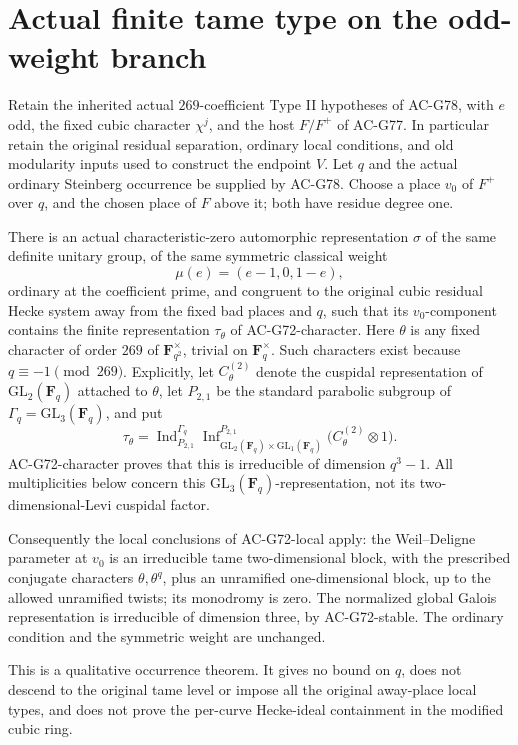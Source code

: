 \section{Actual finite tame type on the odd-weight branch}
\label{sec:cubic-actual-finite-type}

\begin{theorem}
\label{thm:G78-type}
Retain the inherited actual \(269\)-coefficient Type II hypotheses
of AC-G78, with \(e\) odd, the fixed cubic character \(\chi^j\),
and the host \(F/F^+\) of AC-G77.
In particular retain the original residual separation, ordinary
local conditions, and old modularity inputs used to construct
the endpoint \(V\).
Let \(q\) and the actual ordinary Steinberg occurrence be supplied
by AC-G78.  Choose a place \(v_0\) of \(F^+\) over \(q\), and the
chosen place of \(F\) above it; both have residue degree one.

There is an actual characteristic-zero automorphic representation
\(\sigma\) of the same definite unitary group, of the same symmetric
classical weight
\[
                         \mu(e)=(e-1,0,1-e),
\]
ordinary at the coefficient prime, and congruent to the original
cubic residual Hecke system away from the fixed bad places and \(q\),
such that its \(v_0\)-component contains the finite representation
\(\tau_\theta\) of AC-G72-character.
Here \(\theta\) is any fixed character of order \(269\) of
\(\mathbf F_{q^2}^{\times}\), trivial on
\(\mathbf F_q^\times\).  Such characters exist because
\(q\equiv-1\pmod{269}\).
Explicitly, let \(C_\theta^{(2)}\) denote the cuspidal
representation of \(\mathrm{GL}_2(\mathbf F_q)\) attached to
\(\theta\), let \(P_{2,1}\) be the standard parabolic subgroup
of \(\Gamma_q=\mathrm{GL}_3(\mathbf F_q)\), and put
\[
 \tau_\theta=
 \operatorname{Ind}_{P_{2,1}}^{\Gamma_q}
       \operatorname{Inf}_{\mathrm{GL}_2(\mathbf F_q)
                      \times\mathrm{GL}_1(\mathbf F_q)}^{P_{2,1}}
                    \bigl(C_\theta^{(2)}\otimes1\bigr).
 \tag{G78T.0}
\]
AC-G72-character proves that this is irreducible of dimension
\(q^3-1\).  All multiplicities below concern this
\(\mathrm{GL}_3(\mathbf F_q)\)-representation, not its
two-dimensional-Levi cuspidal factor.

Consequently the local conclusions of AC-G72-local apply:
the Weil--Deligne parameter at \(v_0\) is an irreducible tame
two-dimensional block, with the prescribed conjugate characters
\(\theta,\theta^q\), plus an unramified one-dimensional block,
up to the allowed unramified twists; its monodromy is zero.
The normalized global Galois representation is irreducible of
dimension three, by AC-G72-stable.
The ordinary condition and the symmetric weight are unchanged.

This is a qualitative occurrence theorem.  It gives no bound on
\(q\), does not descend to the original tame level or impose all
the original away-place local types, and does not prove the
per-curve Hecke-ideal containment in the modified cubic ring.
\end{theorem}

